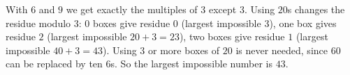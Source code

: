 With $6$ and $9$ we get exactly the multiples of $3$ except $3$. Using $20$s changes the residue modulo $3$: $0$ boxes give residue $0$ (largest impossible $3$), one box gives residue $2$ (largest impossible $20+3=23$), two boxes give residue $1$ (largest impossible $40+3=43$). Using $3$ or more boxes of $20$ is never needed, since $60$ can be replaced by ten $6$s. So the largest impossible number is $\boxed{43}$.
